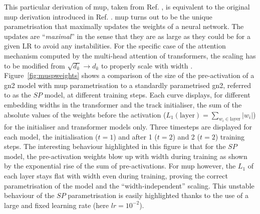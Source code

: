 This particular derivation of \gls{mup}, taken from Ref. \cite{yang2021tuning}, is equivalent to the original \gls{mup} derivation introduced in Ref. \cite{pmlr-v139-yang21c}. \gls{mup} turns out to be the unique parametrisation that maximally updates the weights of a neural network. The updates are ``\textit{maximal}'' in the sense that they are as large as they could be for a given LR to avoid any instabilities. For the specific case of the attention mechanism computed by the multi-head attention of transformers, the scaling has to be modified from $\sqrt{d_k} \rightarrow d_k$ to properly scale with width \cite{yang2021tuning}. Figure~\ref{fig:muspweights} shows a comparison of the size of the pre-activation of a \gls{gn2} model with \gls{mup} parametrisation to a standardly parametrised \gls{gn2}, referred to as the $SP$ model, at different training steps. Each curve displays, for different embedding widths in the transformer and the track initialiser, the sum of the absolute values of the weights before the activation ($L_1(\textrm{layer}) = \sum_{w_i \in \textrm{layer}} |w_i|$) for the initialiser and transformer models only. Three timesteps are displayed for each model, the initialisation ($t=1$) and after 1 ($t=2$) and 2 ($t=2$) training steps. The interesting behaviour highlighted in this figure is that for the $SP$ model, the pre-activation weights blow up with width during training as shown by the exponential rise of the sum of pre-activations. For \gls{mup} however, the $L_1$ of each layer stays flat with width even during training, proving the correct parametrisation of the model and the ``width-independent'' scaling. This unstable behaviour of the $SP$ parametrisation is easily highlighted thanks to the use of a large and fixed learning rate (here $lr = 10^{-2}$). 

